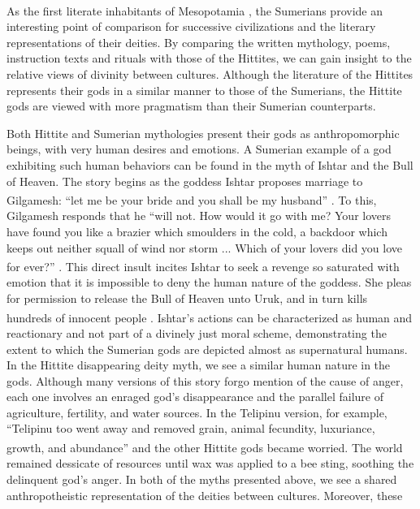 As the first literate inhabitants of
Mesopotamia \textsuperscript{\cite[p.20]{george}}, the Sumerians
provide an interesting point of comparison for successive
civilizations and the literary representations of their deities.  By
comparing the written mythology, poems, instruction texts and rituals
with those of the Hittites, we can gain insight to the relative views
of divinity between cultures.  Although the literature of the Hittites
represents their gods in a similar manner to those of the Sumerians,
the Hittite gods are viewed with more pragmatism than their Sumerian
counterparts.

Both Hittite and Sumerian mythologies present their gods as
anthropomorphic beings, with very human desires and emotions.
A Sumerian example of a god exhibiting such human behaviors can be
found in the myth of Ishtar and the Bull of Heaven. The story begins
as the goddess Ishtar proposes marriage to Gilgamesh: ``let me be your
bride and you shall be my
husband'' \textsuperscript{\cite[p.102]{george}}. To this, Gilgamesh
responds that he ``will not. How would it go with me?  Your lovers
have found you like a brazier which smoulders in the cold, a backdoor
which keeps out neither squall of wind nor storm ... Which of your
lovers did you love for
ever?'' \textsuperscript{\cite[p.103]{george}}.
This direct insult incites Ishtar to seek a revenge so saturated with
emotion that it is impossible to deny the human nature of the goddess.
She pleas for permission to release the Bull of Heaven unto Uruk, and
in turn kills hundreds of innocent
people \textsuperscript{\cite[p.103]{george}}. Ishtar's actions can be
characterized as human and reactionary and not part of a divinely just
moral scheme, demonstrating the extent to which the Sumerian gods are
depicted almost as supernatural humans.
In the Hittite disappearing deity myth, we see a similar human nature
in the gods.  Although many versions of this story forgo mention of
the cause of anger, each one involves an enraged god's disappearance
and the parallel failure of agriculture, fertility, and water sources.
In the Telipinu version, for example, ``Telipinu too went away and
removed grain, animal fecundity, luxuriance, growth, and
abundance'' \textsuperscript{\cite[p.14]{hoffner}} and the other
Hittite gods became worried. The world remained dessicate of resources
until wax was applied to a bee sting, soothing the delinquent god's
anger.
In both of the myths presented above, we see a shared anthropotheistic
representation of the deities between cultures. Moreover, these
